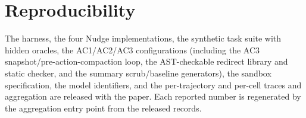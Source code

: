 \documentclass{article}
\theoremstyle{plain}
\theoremstyle{definition}
\begin{document}
\section{Reproducibility}

The harness, the four Nudge implementations, the synthetic task suite with hidden oracles, the AC1/AC2/AC3 configurations (including the AC3 snapshot/pre-action-compaction loop, the AST-checkable redirect library and static checker, and the summary scrub/baseline generators), the sandbox specification, the model identifiers, and the per-trajectory and per-cell traces and aggregation are released with the paper. Each reported number is regenerated by the aggregation entry point from the released records.




\nocite{*}


\end{document}
